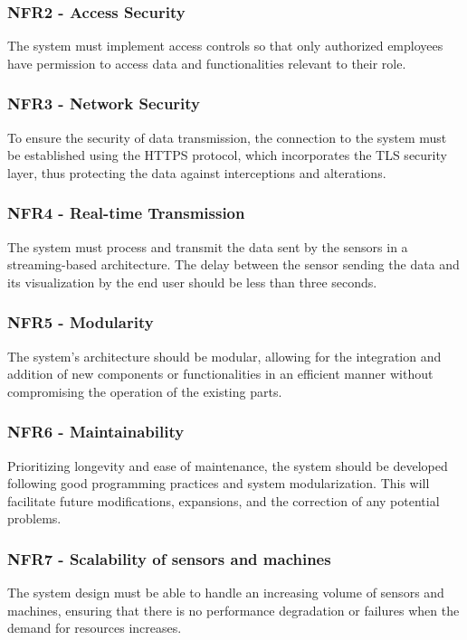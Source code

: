 \subsubsection{NFR2 - Access Security}
The system must implement access controls so that only authorized employees have permission to access data and functionalities relevant to their role.

\subsubsection{NFR3 - Network Security}
To ensure the security of data transmission, the connection to the system must be established using the \gls{HTTPS} protocol, which incorporates the \gls{TLS} security layer, thus protecting the data against interceptions and alterations.

\subsubsection{NFR4 - Real-time Transmission}
The system must process and transmit the data sent by the sensors in a streaming-based architecture. The delay between the sensor sending the data and its visualization by the end user should be less than three seconds.

\subsubsection{NFR5 - Modularity}
The system's architecture should be modular, allowing for the integration and addition of new components or functionalities in an efficient manner without compromising the operation of the existing parts.

\subsubsection{NFR6 - Maintainability}
Prioritizing longevity and ease of maintenance, the system should be developed following good programming practices and system modularization. This will facilitate future modifications, expansions, and the correction of any potential problems.

\subsubsection{NFR7 - Scalability of sensors and machines}
The system design must be able to handle an increasing volume of sensors and machines, ensuring that there is no performance degradation or failures when the demand for resources increases.


